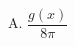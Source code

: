 \documentclass[preview]{standalone}
\begin{document}
\begin{center}
A. $\dfrac{g(x)}{8\pi}$
\end{center}
\end{document}
